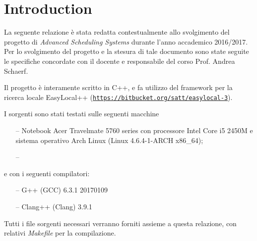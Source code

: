 
\section{Introduction} %
\label{sec:introduction}
    
    La seguente relazione è stata redatta contestualmente allo svolgimento del progetto di \emph{Advanced Scheduling Systems} durante l'anno accademico 2016/2017. Per lo svolgimento del progetto e la stesura di tale documento sono state seguite le specifiche concordate con il docente e responsabile del corso Prof. Andrea Schaerf.

    Il progetto è interamente scritto in C++, e fa utilizzo del framework per la ricerca locale EasyLocal++ (\href{https://bitbucket.org/satt/easylocal-3}{\texttt{https://bitbucket.org/satt/easylocal-3}}).

    I sorgenti sono stati testati sulle seguenti macchine
    \begin{itemize}
        \item[--] Notebook Acer Travelmate 5760 series con processore Intel Core i5 2450M e sistema operativo Arch Linux (Linux 4.6.4-1-ARCH x86\_64);
        \item[--]
    \end{itemize}
    e con i seguenti compilatori:
    \begin{itemize}
        \item[--] G++ (GCC) 6.3.1 20170109
        \item[--] Clang++ (Clang) 3.9.1
    \end{itemize}

    Tutti i file sorgenti necessari verranno forniti assieme a questa relazione, con relativi \emph{Makefile} per la compilazione. 

